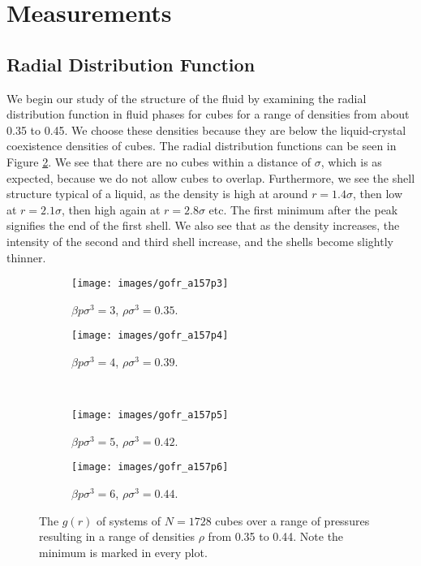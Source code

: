 \documentclass[thesis]{subfiles}
\begin{document}
\newpage

\section{Measurements}

\subsection{Radial Distribution Function} \label{subsec:res_rdf}

We begin our study of the structure of the fluid by examining the radial distribution function in fluid phases for cubes for a range of densities from about 0.35 to 0.45. We choose these densities because they are below the liquid-crystal coexistence densities of cubes. The radial distribution functions can be seen in Figure \ref{fig:gofr_90liq}. We see that there are no cubes within a distance of $\sigma$, which is as expected, because we do not allow cubes to overlap. Furthermore, we see the shell structure typical of a liquid, as the density is high at around $r=1.4\sigma$, then low at $r=2.1\sigma$, then high again at $r=2.8\sigma$ etc.
The first minimum after the peak signifies the end of the first shell. We also see that as the density increases, the intensity of the second and third shell increase, and the shells become slightly thinner.

\begin{figure}[h]
	\centering
	\begin{subfigure}{0.49\textwidth}
		\texttt{[image: images/gofr\_a157p3]}
		\caption{$\beta p \sigma^3 = 3$, $\rho \sigma^3 = 0.35$. }
	\end{subfigure}
	\begin{subfigure}{0.49\textwidth}
		\texttt{[image: images/gofr\_a157p4]}
		\caption{$\beta p \sigma^3 = 4$, $\rho \sigma^3 = 0.39$. }
	\end{subfigure}
\\
\vspace{10pt}
	\begin{subfigure}{0.49\textwidth}
		\texttt{[image: images/gofr\_a157p5]}
		\caption{$\beta p \sigma^3 = 5$, $\rho \sigma^3 = 0.42$. }
	\end{subfigure}
	\begin{subfigure}{0.49\textwidth}
		\texttt{[image: images/gofr\_a157p6]}
		\caption{$\beta p \sigma^3 = 6$, $\rho \sigma^3 = 0.44$. }\label{fig:gofr_90liqp6}
	\end{subfigure}

	\caption{The $g(r)$ of systems of $N = 1728$ cubes over a range of pressures resulting in a range of densities $\rho$ from 0.35 to 0.44. Note the minimum is marked in every plot.}\label{fig:gofr_90liq}
\end{figure}
\end{document}
